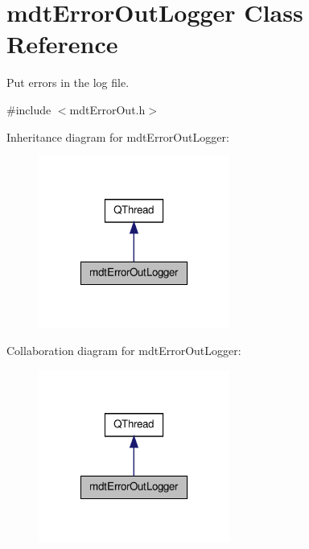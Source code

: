 \hypertarget{classmdt_error_out_logger}{\section{mdt\-Error\-Out\-Logger Class Reference}
\label{classmdt_error_out_logger}
}


Put errors in the log file.  




{\ttfamily \#include $<$mdt\-Error\-Out.\-h$>$}



Inheritance diagram for mdt\-Error\-Out\-Logger\-:
\nopagebreak
\begin{figure}[H]
\begin{center}
\leavevmode
\includegraphics[width=178pt]{classmdt_error_out_logger__inherit__graph}
\end{center}
\end{figure}


Collaboration diagram for mdt\-Error\-Out\-Logger\-:
\nopagebreak
\begin{figure}[H]
\begin{center}
\leavevmode
\includegraphics[width=178pt]{classmdt_error_out_logger__coll__graph}
\end{center}
\end{figure}
